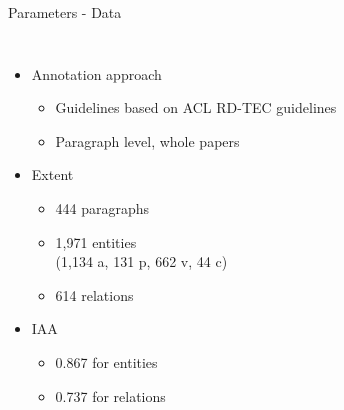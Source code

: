 \documentclass[en,16:9,smallfoot]{sdqbeamer}
\begin{document}
   \begin{frame}{Parameters - Data}
   \begin{columns}
           \begin{itemize}
               \item Annotation approach
               \begin{itemize}
                  \item Guidelines based on ACL RD-TEC guidelines~\cite{Qasemizadeh2016}
                  \item Paragraph level, whole papers
               \end{itemize}
               \item Extent
               \begin{itemize}
                  \item 444 paragraphs
                  \item 1,971 entities\\(1,134 a, 131 p, 662 v, 44 c)
                  \item 614 relations
               \end{itemize}
               \item IAA
               \begin{itemize}
                  \item 0.867 for entities
                  \item 0.737 for relations
               \end{itemize}
           \end{itemize}
\end{columns}
\end{frame}
\end{document}
